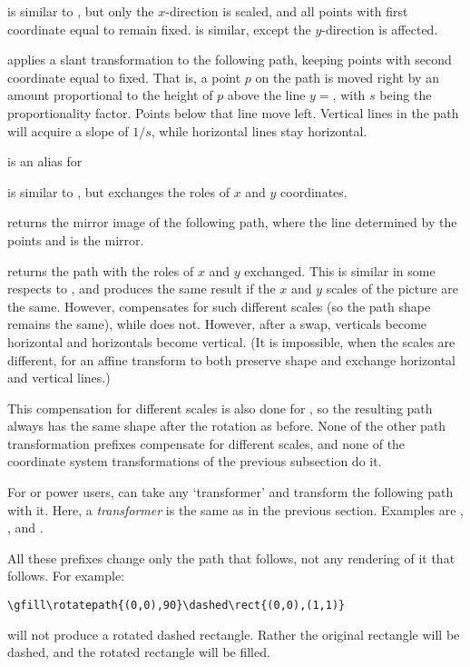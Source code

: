 \documentclass[letterpaper]{article}
\begin{document}
 is similar to , but only the $x$-direction
is scaled, and all points with first coordinate equal to  remain
fixed.  is similar, except the $y$-direction is affected.

 applies a slant transformation to the following path,
keeping points with second coordinate equal to  fixed. That is,
a point $p$ on the path is moved right by an amount proportional to the
height of $p$ above the line $y={}$, with $s$ being the
proportionality factor. Points below that line move left. Vertical lines
in the path will acquire a slope of $1/s$, while horizontal lines stay
horizontal.

 is an alias for 

 is similar to , but exchanges the roles
of $x$ and $y$ coordinates.

 returns the mirror image of the following path, where
the line determined by the points  and  is the
mirror.

 returns the path with the roles of $x$ and $y$
exchanged. This is similar in some respects to
, and produces the same result if the
$x$ and $y$ scales of the picture are the same. However,
 compensates for such different scales (so the path
shape remains the same), while  does not. However, after
a swap, verticals become horizontal and horizontals become vertical.
(It is impossible, when the scales are different, for an affine transform
to both preserve shape and exchange horizontal and vertical lines.)

This compensation for different scales is also done for ,
so the resulting path always has the same shape after the rotation as
before. None of the other path transformation prefixes compensate for
different scales, and none of the coordinate system transformations of
the previous subsection do it.

For \MF{} or \MP{} power users,  can take any
`transformer' and transform the following path with it. Here, a
\emph{transformer} is the same as in the previous section. Examples are
, , and .

All these prefixes change only the path that follows, not any rendering
of it that follows. For example:
\begin{verbatim}
\gfill\rotatepath{(0,0),90}\dashed\rect{(0,0),(1,1)}
\end{verbatim}
will not produce a rotated dashed rectangle. Rather the original
rectangle will be dashed, and the rotated rectangle will be filled.
\end{document}
